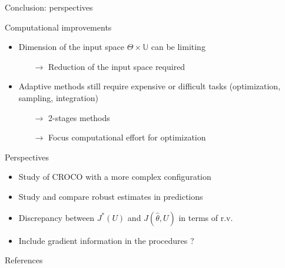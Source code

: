 \documentclass[10pt,aspectratio=169,usepdftitle=false]{beamer}
\newcommand{\Uspace}{\mathbb{U}}
\newcommand{\Kspace}{\Theta}
\newcommand{\kk}{\theta}
\newcommand{\UU}{U}
\begin{document}
\begin{frame}[label=conclusion]{Conclusion: perspectives}
  \begin{block}{Computational improvements}
    \begin{itemize}
    \item Dimension of the input space $\Kspace \times \Uspace$ can be limiting
      \begin{itemize}
      \item[$\rightarrow$] Reduction of the input space required
      \end{itemize}
    \item Adaptive methods still require expensive or difficult tasks (optimization, sampling, integration)
      \begin{itemize}
      \item[$\rightarrow$] 2-stages methods
      \item[$\rightarrow$] Focus computational effort for optimization
      \end{itemize}
    \end{itemize}
  \end{block}

  \begin{block}{Perspectives}
    \begin{itemize}
    \item Study of CROCO with a more complex configuration
    \item Study and compare robust estimates in predictions
    \item Discrepancy between $J^*(\UU)$ and $J(\hat{\kk},\UU)$ in terms of r.v.
    \item Include gradient information in the procedures ?
  \end{itemize}
  \end{block}
\end{frame}
\appendix

\begin{frame}[allowframebreaks]{References}
  \renewcommand{\bibsection}{}

  
\end{frame}
\end{document}
